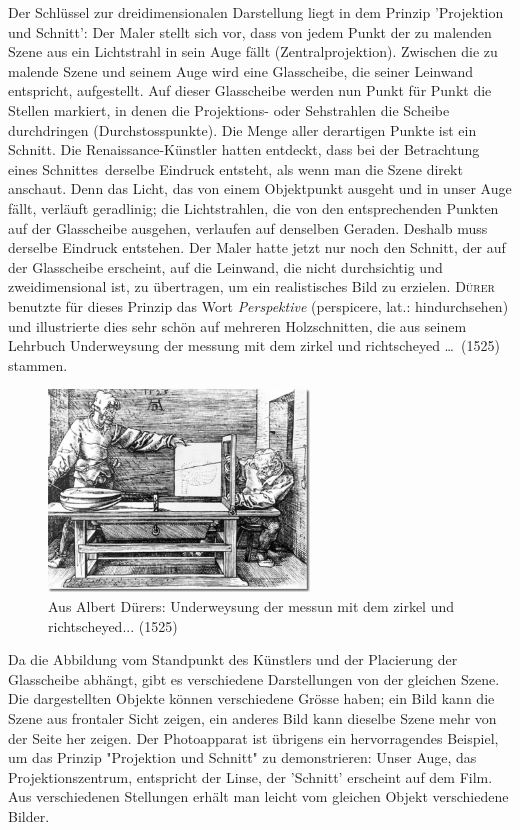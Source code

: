 \documentclass[%
11pt,%
twoside,%
titlepage,%
a4page,%
german,%
headsepline%
]{scrartcl}
\begin{document}
Der Schl\"ussel zur dreidimensionalen Darstellung liegt in dem Prinzip 'Projektion und Schnitt': Der Maler stellt sich vor, dass von jedem Punkt der zu malenden Szene aus ein Lichtstrahl in sein Auge f\"allt (Zentralprojektion). Zwischen die zu malende Szene und seinem Auge wird
eine Glasscheibe, die seiner Leinwand entspricht, aufgestellt. Auf dieser Glasscheibe werden nun Punkt f\"ur Punkt die Stellen markiert, in denen die Projektions- oder Sehstrahlen die Scheibe durchdringen (Durchstosspunkte). Die Menge aller derartigen Punkte ist ein \glqq Schnitt\grqq. Die Renaissance-K\"unstler hatten entdeckt, dass bei der Betrachtung eines \glqq Schnittes\grqq\ derselbe Eindruck entsteht, als wenn man die Szene direkt anschaut. Denn das Licht, das von einem Objektpunkt ausgeht und in unser Auge f\"allt, verl\"auft geradlinig; die Lichtstrahlen, die von den entsprechenden Punkten auf der Glasscheibe ausgehen, verlaufen auf denselben Geraden. Deshalb muss derselbe Eindruck entstehen. Der Maler hatte jetzt nur noch den \glqq Schnitt\grqq, der auf der Glasscheibe erscheint, auf die Leinwand, die nicht durchsichtig und zweidimensional ist, zu \"ubertragen, um ein realistisches Bild zu erzielen. \textsc{D\"urer} benutzte f\"ur dieses Prinzip das Wort \emph{Perspektive} (perspicere, lat.: hindurchsehen) und illustrierte dies sehr sch\"on auf mehreren Holzschnitten, die aus seinem Lehrbuch \glqq Underweysung der messung mit dem zirkel und richtscheyed \dots\grqq\ (1525) stammen.

\begin{figure}[h!]
\begin{center}
\includegraphics[width=0.618\textwidth]{pictures/durer}
\caption{Aus Albert D\"urers: Underweysung der messun mit dem zirkel und richtscheyed... (1525)}
\end{center}
\end{figure}

Da die Abbildung vom Standpunkt des K\"unstlers und der Placierung der Glasscheibe abh\"angt, gibt es verschiedene Darstellungen von der gleichen Szene. Die dargestellten Objekte k\"onnen verschiedene Gr\"osse haben; ein Bild kann die Szene aus frontaler Sicht zeigen, ein anderes Bild kann dieselbe Szene mehr von der Seite her zeigen. Der Photoapparat ist \"ubrigens ein hervorragendes Beispiel, um das Prinzip "Projektion und Schnitt" zu demonstrieren: Unser Auge, das Projektionszentrum, entspricht der Linse, der 'Schnitt' erscheint auf dem Film. Aus verschiedenen Stellungen erh\"alt man leicht vom gleichen Objekt verschiedene Bilder.
\end{document}
